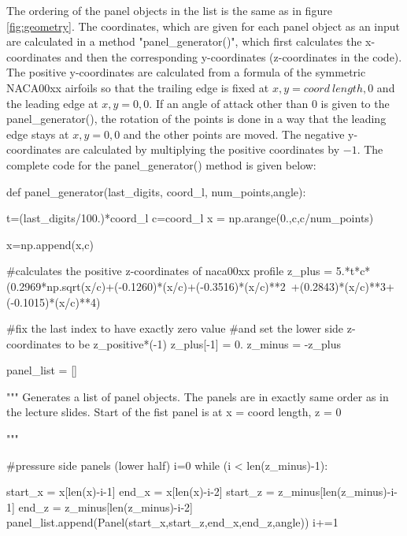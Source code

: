 \documentclass[a4paper,12pt]{article}
\begin{document}
The ordering of the panel objects in the list is the same as in figure \ref{fig:geometry}. The coordinates, which are given for each panel object as an input are calculated in a method "panel\_generator()", which first calculates the x-coordinates and then the corresponding y-coordinates (z-coordinates in the code). The positive y-coordinates are calculated from a formula of the symmetric NACA00xx airfoils so that the trailing edge is fixed at $x,y = coord\ length, 0$ and the leading edge at $x,y = 0,0$. If an angle of attack other than 0 is given to the panel\_generator(), the rotation of the points is done in a way that the leading edge stays at $x,y = 0,0$ and the other points are moved. The negative y-coordinates are calculated by multiplying the positive coordinates by $-1$. The complete code for the panel\_generator() method is given below:
\begin{python}
def panel_generator(last_digits, coord_l, num_points,angle):
        
                   
        t=(last_digits/100.)*coord_l
        c=coord_l
        x = np.arange(0.,c,c/num_points)
        
        x=np.append(x,c)
        
        #calculates the positive z-coordinates of naca00xx profile
        z_plus = 5.*t*c*(0.2969*np.sqrt(x/c)+(-0.1260)*(x/c)+(-0.3516)*(x/c)**2\
                        +(0.2843)*(x/c)**3+(-0.1015)*(x/c)**4)
        
        #fix the last index to have exactly zero value 
        #and set the lower side z-coordinates to be z_positive*(-1) 
        z_plus[-1] = 0.
        z_minus = -z_plus

       
        panel_list = []
        
              
        """
        Generates a list of panel objects. 
       The panels are in exactly same order as in the lecture slides.
        Start of the fist panel is at x = coord length, z = 0
        
        """

        #pressure side panels (lower half)
        i=0
        while (i < len(z_minus)-1):
                
                start_x = x[len(x)-i-1]
                end_x = x[len(x)-i-2]
                start_z = z_minus[len(z_minus)-i-1]
                end_z = z_minus[len(z_minus)-i-2]                           
                panel_list.append(Panel(start_x,start_z,end_x,end_z,angle))
                i+=1


\end{python}
\end{document}
